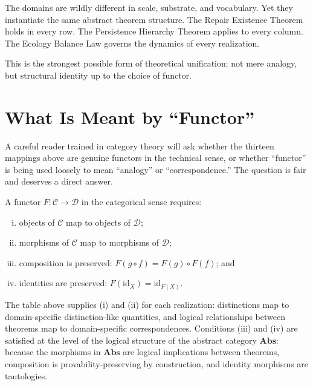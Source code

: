\documentclass[12pt,twoside,openright]{book}
\begin{document}
\noindent
The domains are wildly different in scale, substrate,
and vocabulary. Yet they instantiate the same abstract
theorem structure. The Repair Existence Theorem holds
in every row. The Persistence Hierarchy Theorem applies
to every column. The Ecology Balance Law governs
the dynamics of every realization.

This is the strongest possible form of theoretical
unification: not mere analogy, but structural identity
up to the choice of functor.

\section{What Is Meant by ``Functor''}
\label{sec:ch30-functor-meaning}

A careful reader trained in category theory will ask
whether the thirteen mappings above are genuine functors
in the technical sense, or whether ``functor'' is being
used loosely to mean ``analogy'' or ``correspondence.''
The question is fair and deserves a direct answer.

A functor $F : \mathcal{C} \to \mathcal{D}$ in the
categorical sense requires:
\begin{enumerate}[(i)]
  \item objects of $\mathcal{C}$ map to objects of
        $\mathcal{D}$;
  \item morphisms of $\mathcal{C}$ map to morphisms of
        $\mathcal{D}$;
  \item composition is preserved: $F(g \circ f) =
        F(g) \circ F(f)$; and
  \item identities are preserved: $F(\mathrm{id}_X) =
        \mathrm{id}_{F(X)}$.
\end{enumerate}
The table above supplies (i) and (ii) for each realization:
distinctions map to domain-specific distinction-like
quantities, and logical relationships between theorems map
to domain-specific correspondences. Conditions (iii) and
(iv) are satisfied at the level of the logical structure
of the abstract category $\mathbf{Abs}$: because the
morphisms in $\mathbf{Abs}$ are logical implications
between theorems, composition is provability-preserving
by construction, and identity morphisms are tautologies.
\end{document}
